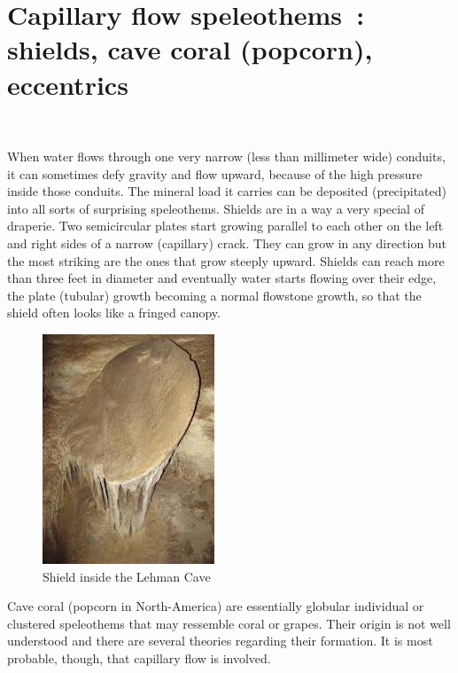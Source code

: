 \documentclass[draft, final]{report}
\begin{document}
\chapter{Capillary flow speleothems : shields, cave coral (popcorn), eccentrics}
~\par
When water flows through one very narrow (less than millimeter wide) conduits, it can sometimes defy gravity and flow upward, because of the high pressure inside those conduits. The mineral load it carries can be deposited (precipitated) into all sorts of surprising speleothems. Shields are in a way a very special of draperie. Two semicircular plates start growing parallel to each other on the left and right sides of a narrow (capillary) crack. They can grow in any direction but the most striking are the ones that grow steeply upward. Shields can reach more than three feet in diameter and eventually water starts flowing over their edge, the plate (tubular) growth becoming a normal flowstone growth, so that the shield often looks like a fringed canopy.\\
\begin{figure}[!ht]
    \centering
    \includegraphics[scale=0.8]{LateX/Images/shield.jpg}
    \caption{Shield inside the Lehman Cave\cite{caveshelder}}
\end{figure}
\clearpage
Cave coral (popcorn in North-America) are essentially globular individual or clustered speleothems that may ressemble coral or grapes.
Their origin is not well understood and there are several theories regarding their formation. It is most probable, though, that capillary flow is involved.\\
\end{document}
